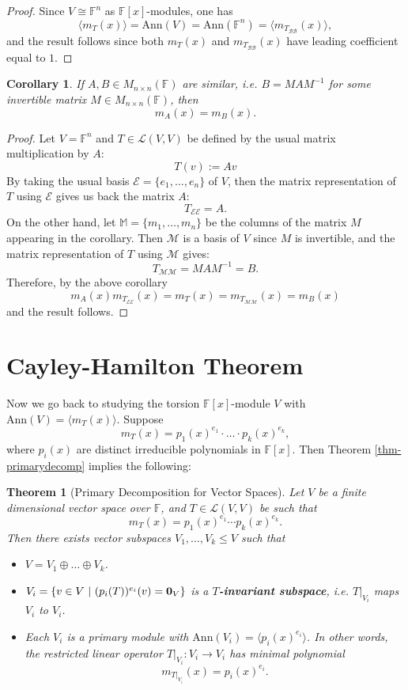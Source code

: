 \documentclass[11pt,openany]{book}
\theoremstyle{plain}
\newtheorem{theorem}{Theorem}[chapter]
\newtheorem{corollary}[corollary]{Corollary}
\theoremstyle{definition}
\theoremstyle{remark}
\begin{document}
\begin{proof}
    Since $V \cong \mathbb{F}^n$ as $\mathbb{F}[x]$-modules, one has
    $$\langle m_T(x) \rangle = \mathrm{Ann}(V) = \mathrm{Ann}(\mathbb{F}^n) = \langle m_{T_{\mathcal{B}\mathcal{B}}}(x) \rangle,$$
    and the result follows since both $m_T(x)$ and $m_{T_{\mathcal{B}\mathcal{B}}}(x)$ have leading coefficient equal to $1$.
\end{proof}


\begin{corollary} \label{cor-minpolyconj}
    If $A, B \in M_{n \times n}(\mathbb{F})$ are similar, i.e. $B = MAM^{-1}$ for some invertible matrix $M \in M_{n \times n}(\mathbb{F})$, then 
    $$m_{A}(x) = m_{B}(x).$$
\end{corollary}

\begin{proof}
Let $V = \mathbb{F}^n$ and $T \in \mathcal{L}(V,V)$ be defined by the usual matrix multiplication by $A$:
$$T(v) := Av$$
By taking the usual basis $\mathcal{E} = \{e_1, \dots, e_n\}$ of $V$, then the matrix representation of $T$ using $\mathcal{E}$ gives us back the matrix $A$:
$$T_{\mathcal{E}\mathcal{E}} = A.$$
On the other hand, let $\mathbb{M} = \{m_1, \dots, m_n\}$ be the columns of the matrix $M$ appearing in the corollary. Then $\mathcal{M}$ is a basis of $V$ since $M$ is invertible, and the matrix representation of $T$ using $\mathcal{M}$ gives:
$$T_{\mathcal{M}\mathcal{M}} = MAM^{-1} = B.$$
Therefore, by the above corollary
$$m_{A}(x) m_{T_{\mathcal{E}\mathcal{E}}}(x) = m_{T}(x) = m_{T_{\mathcal{M}\mathcal{M}}}(x) = m_{B}(x)$$
and the result follows.
\end{proof}

\section{Cayley-Hamilton Theorem}
Now we go back to studying the torsion $\mathbb{F}[x]$-module $V$ with $\mathrm{Ann}(V) = \langle m_T(x) \rangle$. Suppose
$$m_T(x) = p_1(x)^{e_1} \cdot \dots \cdot p_k(x)^{e_k},$$
where $p_i(x)$ are distinct irreducible polynomials in $\mathbb{F}[x]$. Then 
Theorem \ref{thm-primarydecomp} implies the following:
\begin{theorem}[Primary Decomposition for Vector Spaces] \label{thm-primaryvs}
Let $V$ be a finite dimensional vector space over $\mathbb{F}$, and $T \in \mathcal{L}(V,V)$ be such that
$$m_T(x) = p_1(x)^{e_1} \cdots p_k(x)^{e_k}.$$ 
Then there exists vector subspaces $V_1, \dots, V_k \leq V$ such that
\begin{itemize}
    \item $V = V_1 \oplus \dots \oplus V_k$.
    \item $V_i = \{v \in V\ |\ (p_i(T))^{e_i}(v) = {\bf 0}_V\}$ is a {\bf $T$-invariant subspace}, i.e. $T|_{V_i}$ maps $V_i$ to $V_i$.
    \item Each $V_i$ is a primary module with $\mathrm{Ann}(V_i) = \langle p_i(x)^{e_i} \rangle$. In other words, the restricted linear operator $T|_{V_i}: V_i \to V_i$ has minimal polynomial 
    $$m_{T|_{V_i}}(x) = p_i(x)^{e_i}.$$
\end{itemize}
\end{theorem}
\end{document}
